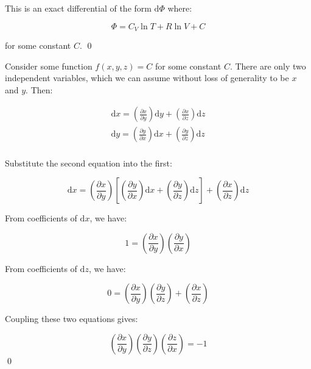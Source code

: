 \documentclass[12pt]{article}
\begin{document}
This is an exact differential of the form $\mathrm{d}\Phi$ where:

\begin{equation}
    \Phi = C_{V} \ln{T} + R \ln{V} + C
\end{equation}

for some constant $C$.
\qed


Consider some function $f(x, y, z) = C$ for some constant $C$. There are only two independent variables, which we can assume without loss of generality to be $x$ and $y$. Then:

\begin{equation}
\begin{split}
    \mathrm{d}x = \left( \frac{\partial x}{\partial y} \right) \mathrm{d}y + \left( \frac{\partial x}{\partial z} \right) \mathrm{d}z \\
    \mathrm{d}y = \left( \frac{\partial y}{\partial x} \right) \mathrm{d}x + \left( \frac{\partial y}{\partial z} \right) \mathrm{d}z \\
\end{split}
\end{equation}

Substitute the second equation into the first:

\begin{equation}
    \mathrm{d}x = \left( \frac{\partial x}{\partial y} \right) \left[ \left( \frac{\partial y}{\partial x} \right) \mathrm{d}x + \left( \frac{\partial y}{\partial z} \right) \mathrm{d}z \right] + \left( \frac{\partial x}{\partial z} \right) \mathrm{d}z
\end{equation}

From coefficients of $\mathrm{d}x$, we have:

\begin{equation}
    1 = \left( \frac{\partial x}{\partial y} \right) \left( \frac{\partial y}{\partial x} \right)
\end{equation}

From coefficients of $\mathrm{d}z$, we have:

\begin{equation}
    0 = \left( \frac{\partial x}{\partial y} \right) \left( \frac{\partial y}{\partial z} \right) + \left( \frac{\partial x}{\partial z} \right)
\end{equation}

Coupling these two equations gives:

\begin{equation}
    \left( \frac{\partial x}{\partial y} \right) \left( \frac{\partial y}{\partial z} \right) \left( \frac{\partial z}{\partial x} \right) = -1
\end{equation}
\qed
\end{document}

